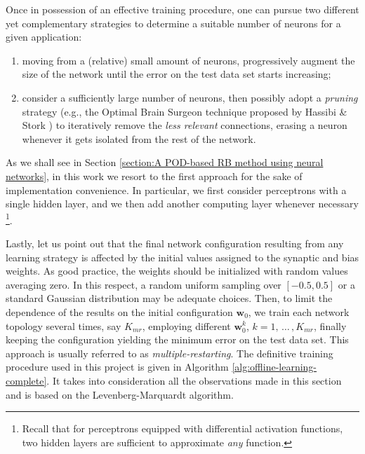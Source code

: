 \documentclass[12pt, a4paper, twoside, openright, notitlepage]{report}
\numberwithin{equation}{chapter}
\theoremstyle{theorem}
\theoremstyle{definition}
\theoremstyle{remark}
\theoremstyle{proposition}
\numberwithin{figure}{chapter}
\begin{document}
		Once in possession of an effective training procedure, one can pursue two different yet complementary strategies to determine a suitable number of neurons for a given application:
		\begin{enumerate}[label=(\alph*)]
			\item moving from a (relative) small amount of neurons, progressively augment the size of the network until the error on the test data set starts increasing;
			\item consider a sufficiently large number of neurons, then possibly adopt a \emph{pruning} strategy (e.g., the Optimal Brain Surgeon technique proposed by Hassibi \& Stork \cite{OBS}) to iteratively remove the \emph{less relevant} connections, erasing a neuron whenever it gets isolated from the rest of the network.
		\end{enumerate}
		As we shall see in Section \ref{section:A POD-based RB method using neural networks}, in this work we resort to the first approach for the sake of implementation convenience. In particular, we first consider perceptrons with a single hidden layer, and we then add another computing layer whenever necessary \footnote{Recall that for perceptrons equipped with differential activation functions, two hidden layers are sufficient to approximate \emph{any} function.}.
		
		Lastly, let us point out that the final network configuration resulting from any learning strategy is affected by the initial values assigned to the synaptic and bias weights. As good practice, the weights should be initialized with random values averaging zero. In this respect, a random uniform sampling over $[-0.5,0.5]$ or a standard Gaussian distribution may be adequate choices. Then, to limit the dependence of the results on the initial configuration $\mathbf{w}_0$, we train each network topology several times, say $K_{mr}$, employing different $\mathbf{w}_0^k$, $k = 1, \, \ldots \, , K_{mr}$, finally keeping the configuration yielding the minimum error on the test data set. This approach is usually referred to as \emph{multiple-restarting}. The definitive training procedure used in this project is given in Algorithm \ref{alg:offline-learning-complete}. It takes into consideration all the observations made in this section and is based on the Levenberg-Marquardt algorithm.
			
\end{document}
